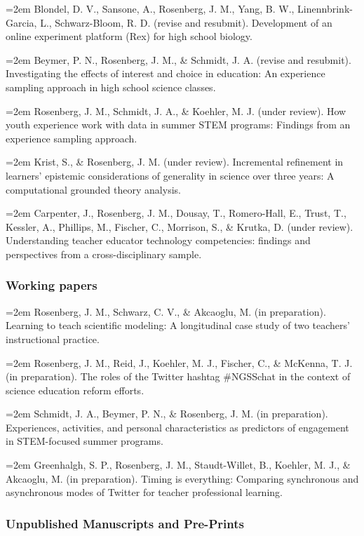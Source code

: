 \documentclass[14,]{article}
\begin{document}
\hangindent=2em Blondel, D. V., Sansone, A., Rosenberg, J. M., Yang, B.
W., Linennbrink-Garcia, L., Schwarz-Bloom, R. D. (revise and resubmit).
Development of an online experiment platform (Rex) for high school
biology.

\hangindent=2em Beymer, P. N., Rosenberg, J. M., \& Schmidt, J. A.
(revise and resubmit). Investigating the effects of interest and choice
in education: An experience sampling approach in high school science
classes.

\hangindent=2em Rosenberg, J. M., Schmidt, J. A., \& Koehler, M. J.
(under review). How youth experience work with data in summer STEM
programs: Findings from an experience sampling approach.

\hangindent=2em Krist, S., \& Rosenberg, J. M. (under review).
Incremental refinement in learners' epistemic considerations of
generality in science over three years: A computational grounded theory
analysis.

\hangindent=2em Carpenter, J., Rosenberg, J. M., Dousay, T.,
Romero-Hall, E., Trust, T., Kessler, A., Phillips, M., Fischer, C.,
Morrison, S., \& Krutka, D. (under review). Understanding teacher
educator technology competencies: findings and perspectives from a
cross-disciplinary sample.

\subsubsection{Working papers}\label{working-papers}

\hangindent=2em Rosenberg, J. M., Schwarz, C. V., \& Akcaoglu, M. (in
preparation). Learning to teach scientific modeling: A longitudinal case
study of two teachers' instructional practice.

\hangindent=2em Rosenberg, J. M., Reid, J., Koehler, M. J., Fischer, C.,
\& McKenna, T. J. (in preparation). The roles of the Twitter hashtag
\#NGSSchat in the context of science education reform efforts.

\hangindent=2em Schmidt, J. A., Beymer, P. N., \& Rosenberg, J. M. (in
preparation). Experiences, activities, and personal characteristics as
predictors of engagement in STEM-focused summer programs.

\hangindent=2em Greenhalgh, S. P., Rosenberg, J. M., Staudt-Willet, B.,
Koehler, M. J., \& Akcaoglu, M. (in preparation). Timing is everything:
Comparing synchronous and asynchronous modes of Twitter for teacher
professional learning.

\subsubsection{Unpublished Manuscripts and
Pre-Prints}\label{unpublished-manuscripts-and-pre-prints}
\end{document}
